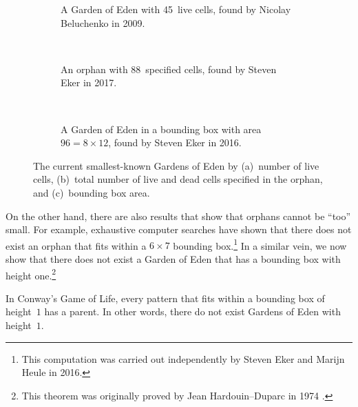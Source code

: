\begin{figure}[!htb]
	\centering
	\begin{subfigure}{.31\textwidth}
		\centering
		\caption{A Garden of Eden with 45~live cells, found by Nicolay Beluchenko in 2009.}
		\label{fig:goe_record_alive}
	\end{subfigure} \ \ \ \ %
	\begin{subfigure}{.31\textwidth}
		\centering
		\caption{An orphan with 88~specified cells, found by Steven Eker in 2017.} %
		\label{fig:goe_record_orphan}
	\end{subfigure} \ \ \ \ %
	\begin{subfigure}{.31\textwidth}
		\centering
		\caption{A Garden of Eden in a bounding box with area $96 = 8 \times 12$, found by Steven Eker in 2016.}
		\label{fig:goe_record_bb}
	\end{subfigure}
	\caption{The current smallest-known Gardens of Eden by (a)~number of live cells, (b)~total number of live and dead cells specified in the orphan, and (c)~bounding box area.}\label{fig:goe_records}
\end{figure}

On the other hand, there are also results that show that orphans cannot be ``too'' small. For example, exhaustive computer searches have shown that there does not exist an orphan that fits within a $6 \times 7$ bounding box.\footnote{This computation was carried out independently by Steven Eker and Marijn Heule in 2016.} In a similar vein, we now show that there does not exist a Garden of Eden that has a bounding box with height one.\footnote{This theorem was originally proved by Jean Hardouin--Duparc in 1974 \cite{Har74}.}

\begin{theorem}\label{thm:1_row_goe}
	In Conway's Game of Life, every pattern that fits within a bounding box of height~$1$ has a parent. In other words, there do not exist Gardens of Eden with height~$1$.
\end{theorem}

